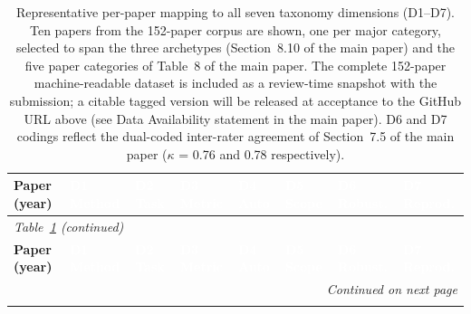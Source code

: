 \documentclass[acmsmall, nonacm, screen]{acmart}
\begin{document}
\begin{landscape}
\setlength{\tabcolsep}{3pt}
\renewcommand{\arraystretch}{1.10}

{\footnotesize
\begin{longtable}{p{3.2cm} p{1.8cm} p{1.1cm} p{1.5cm} p{1.1cm} p{1.2cm} p{1.1cm} p{2.4cm}}
\caption[Representative corpus mapping to all seven taxonomy dimensions]{Representative per-paper mapping to all seven taxonomy dimensions (D1--D7). Ten papers from the 152-paper corpus are shown, one per major category, selected to span the three archetypes (Section~8.10 of the main paper) and the five paper categories of Table~8 of the main paper. The complete 152-paper machine-readable dataset is included as a review-time snapshot with the submission; a citable tagged version will be released at acceptance to the GitHub URL above (see Data Availability statement in the main paper). D6 and D7 codings reflect the dual-coded inter-rater agreement of Section~7.5 of the main paper ($\kappa$ = 0.76 and 0.78 respectively).}
\label{tab:fulltable}\\
\toprule
\textbf{Paper (year)} &
\cellcolor{d1col}\textcolor{white}{\textbf{D1 Method}} &
\cellcolor{d2col}\textcolor{white}{\textbf{D2 Task}} &
\cellcolor{d3col}\textcolor{white}{\textbf{D3 Metric}} &
\cellcolor{d4col}\textcolor{white}{\textbf{D4 Auto}} &
\cellcolor{d5col}\textcolor{white}{\textbf{D5 Scope}} &
\cellcolor{d6col}\textcolor{white}{\textbf{D6 Robust.}} &
\cellcolor{d7col}\textcolor{white}{\textbf{D7 Reprod.}} \\
\midrule
\endfirsthead
\multicolumn{8}{l}{\textit{Table~\ref{tab:fulltable} (continued)}}\\
\toprule
\textbf{Paper (year)} &
\cellcolor{d1col}\textcolor{white}{\textbf{D1 Method}} &
\cellcolor{d2col}\textcolor{white}{\textbf{D2 Task}} &
\cellcolor{d3col}\textcolor{white}{\textbf{D3 Metric}} &
\cellcolor{d4col}\textcolor{white}{\textbf{D4 Auto}} &
\cellcolor{d5col}\textcolor{white}{\textbf{D5 Scope}} &
\cellcolor{d6col}\textcolor{white}{\textbf{D6 Robust.}} &
\cellcolor{d7col}\textcolor{white}{\textbf{D7 Reprod.}} \\
\midrule
\endhead
\midrule \multicolumn{8}{r}{\textit{Continued on next page}}\\ \endfoot
\bottomrule \endlastfoot


\end{longtable}}
\end{landscape}
\end{document}
